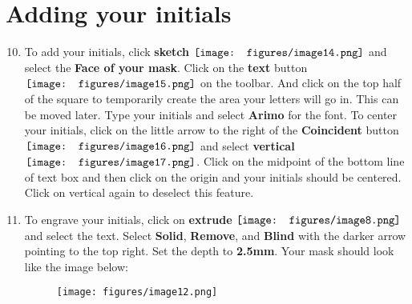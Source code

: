 \documentclass[12pt]{../manual}
\begin{document}
\section{Adding your initials}
\begin{enumerate}
\setcounter{enumi}{9}
\item To add your initials, click {\bf sketch} $\vcenter{\hbox{\texttt{[image: figures/image14.png]}}}$ and select the {\bf Face of your mask}. Click on the {\bf text} button $\vcenter{\hbox{\texttt{[image: figures/image15.png]}}}$ on the toolbar. And click on the top half of the square to temporarily create the area your letters will go in. This can be moved later. Type your initials and select {\bf Arimo} for the font. To center your initials, click on the little arrow to the right of the {\bf Coincident} button $\vcenter{\hbox{\texttt{[image: figures/image16.png]}}}$ and select {\bf vertical} $\vcenter{\hbox{\texttt{[image: figures/image17.png]}}}$. Click on the midpoint of the bottom line of text box and then click on the origin and your initials should be centered. Click on vertical again to deselect this feature.
\item To engrave your initials, click on {\bf extrude} $\vcenter{\hbox{\texttt{[image: figures/image8.png]}}}$ and select the text. Select {\bf Solid}, {\bf Remove}, and {\bf Blind} with the darker arrow pointing to the top right. Set the depth to {\bf 2.5mm}. Your mask should look like the image below:
\begin{figure}[ht!]
\centering
\texttt{[image: figures/image12.png]}
\end{figure}
\end{enumerate}

\newpage
\end{document}
